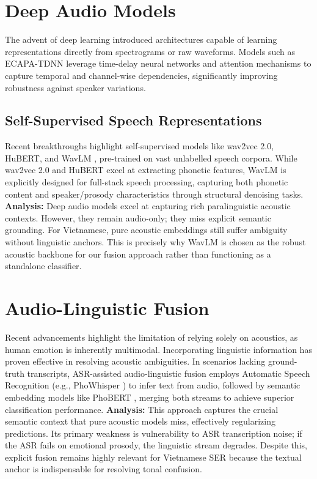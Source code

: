 \documentclass[12pt,a4paper]{report}
\begin{document}
\section{Deep Audio Models}
The advent of deep learning introduced architectures capable of learning representations directly from spectrograms or raw waveforms. Models such as ECAPA-TDNN \cite{desplanques2020ecapa} leverage time-delay neural networks and attention mechanisms to capture temporal and channel-wise dependencies, significantly improving robustness against speaker variations. 

\subsection{Self-Supervised Speech Representations}
Recent breakthroughs highlight self-supervised models like wav2vec 2.0, HuBERT, and WavLM \cite{chen2022wavlm}, pre-trained on vast unlabelled speech corpora. While wav2vec 2.0 and HuBERT excel at extracting phonetic features, WavLM is explicitly designed for full-stack speech processing, capturing both phonetic content and speaker/prosody characteristics through structural denoising tasks. \textbf{Analysis:} Deep audio models excel at capturing rich paralinguistic acoustic contexts. However, they remain audio-only; they miss explicit semantic grounding. For Vietnamese, pure acoustic embeddings still suffer ambiguity without linguistic anchors. This is precisely why WavLM is chosen as the robust acoustic backbone for our fusion approach rather than functioning as a standalone classifier.

\section{Audio-Linguistic Fusion}
Recent advancements highlight the limitation of relying solely on acoustics, as human emotion is inherently multimodal. Incorporating linguistic information has proven effective in resolving acoustic ambiguities. In scenarios lacking ground-truth transcripts, ASR-assisted audio-linguistic fusion employs Automatic Speech Recognition (e.g., PhoWhisper \cite{nguyen2024phowhisper}) to infer text from audio, followed by semantic embedding models like PhoBERT \cite{nguyen2020phobert}, merging both streams to achieve superior classification performance. \textbf{Analysis:} This approach captures the crucial semantic context that pure acoustic models miss, effectively regularizing predictions. Its primary weakness is vulnerability to ASR transcription noise; if the ASR fails on emotional prosody, the linguistic stream degrades. Despite this, explicit fusion remains highly relevant for Vietnamese SER because the textual anchor is indispensable for resolving tonal confusion.
\end{document}
